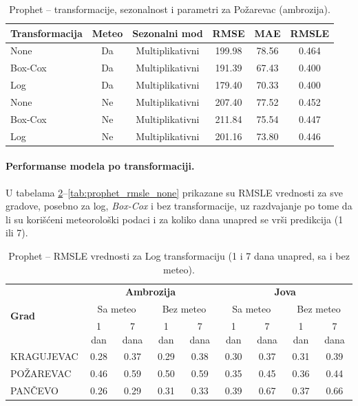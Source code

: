 \documentclass[12pt]{article}
\begin{document}
\begin{table}[h!]
    \label{tab:prophet_params}
\centering
\caption{Prophet – transformacije, sezonalnost i parametri za Požarevac (ambrozija).}

\renewcommand{\arraystretch}{1.3}
\begin{tabular}{|l|c|c|c|c|c|}
\hline
\textbf{Transformacija} & \textbf{Meteo} & \textbf{Sezonalni mod} & \textbf{RMSE} & \textbf{MAE} & \textbf{RMSLE} \\ \hline
None   & Da  & Multiplikativni & 199.98 & 78.56 & 0.464 \\ \hline
Box-Cox & Da  & Multiplikativni & 191.39 & 67.43 & 0.400 \\ \hline
Log    & Da  & Multiplikativni & 179.40 & 70.33 & 0.400 \\ \hline
None   & Ne  & Multiplikativni & 207.40 & 77.52 & 0.452 \\ \hline
Box-Cox & Ne  & Multiplikativni & 211.84 & 75.54 & 0.447 \\ \hline
Log    & Ne  & Multiplikativni & 201.16 & 73.80 & 0.446 \\ \hline
\end{tabular}
\end{table}

\paragraph{\textbf{Performanse modela po transformaciji.}  }
U tabelama \ref{tab:prophet_rmsle_log}–\ref{tab:prophet_rmsle_none} prikazane su RMSLE vrednosti za sve gradove, posebno za log, \textit{Box-Cox} i bez transformacije, uz razdvajanje po tome da li su korišćeni meteorološki podaci i za koliko dana unapred se vrši predikcija (1 ili 7).  

\begin{table}[h!]
\centering
\caption{Prophet – RMSLE vrednosti za Log transformaciju (1 i 7 dana unapred, sa i bez meteo).}
\label{tab:prophet_rmsle_log}
\begin{tabular}{|l|c|c|c|c||c|c|c|c|}
\hline
\multirow{3}{*}{\textbf{Grad}} 
& \multicolumn{4}{c||}{\textbf{Ambrozija}} 
& \multicolumn{4}{c|}{\textbf{Jova}} \\ \cline{2-9}
& \multicolumn{2}{c|}{Sa meteo} & \multicolumn{2}{c||}{Bez meteo} 
& \multicolumn{2}{c|}{Sa meteo} & \multicolumn{2}{c|}{Bez meteo} \\ \cline{2-9}
& 1 dan & 7 dana & 1 dan & 7 dana & 1 dan & 7 dana & 1 dan & 7 dana \\ \hline
KRAGUJEVAC & 0.28 & 0.37 & 0.29 & 0.38 & 0.30 & 0.37 & 0.31 & 0.39 \\ \hline
POŽAREVAC  & 0.46 & 0.59 & 0.50 & 0.59 & 0.35 & 0.45 & 0.36 & 0.44 \\ \hline
PANČEVO    & 0.26 & 0.29 & 0.31 & 0.33 & 0.39 & 0.67 & 0.37 & 0.66 \\ \hline
\end{tabular}
\end{table}
\end{document}
